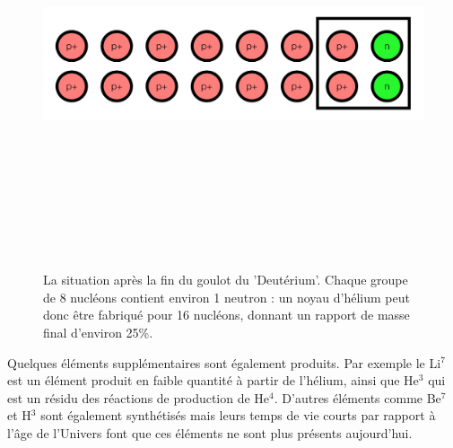 \begin{figure}[htbp]
	\centering
		\includegraphics[height=12cm]{figs/helium.png}
	\caption[La situation après la fin du goulot du Deutérium]{La situation après la fin du goulot du 'Deutérium'. Chaque groupe de 8 nucléons contient environ 1 neutron : un noyau d'hélium peut donc être fabriqué pour 16 nucléons, donnant un rapport de masse final d'environ 25\%.}
	\label{f:helium}
\end{figure}

Quelques éléments supplémentaires sont également produits. Par exemple le Li$^7$ est un élément produit en faible quantité à partir de l'hélium, ainsi que He$^3$ qui est un résidu des réactions de production de He$^4$. D'autres éléments comme Be$^7$  et H$^3$ sont également synthétisés mais leurs temps de vie courts par rapport à l'âge de l'Univers font que ces éléments ne sont plus présents aujourd'hui. 

